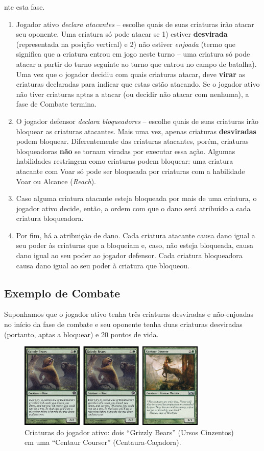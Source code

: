 nte esta fase.

\begin{enumerate}
  \item Jogador ativo \textit{declara atacantes} -- escolhe
quais de suas criaturas irão atacar seu oponente. Uma criatura só pode atacar se 1) estiver \textbf{desvirada} (representada na posição vertical) e 2) não estiver \textit{enjoada} (termo que significa que a criatura entrou em jogo neste turno -- uma criatura só pode atacar a partir do turno seguinte ao turno que entrou no campo de batalha). Uma vez que o jogador decidiu com quais criaturas atacar, deve \textbf{virar} as criaturas declaradas para indicar que estas estão atacando. Se o jogador ativo não tiver criaturas aptas a atacar (ou decidir não atacar com nenhuma), a fase de Combate termina.
    \item O jogador defensor \textit{declara bloqueadores} -- escolhe quais de suas criaturas irão
bloquear as criaturas atacantes. Mais uma vez, apenas criaturas \textbf{desviradas} podem bloquear. Diferentemente das criaturas atacantes, porém, criaturas bloqueadoras \textbf{não} se tornam viradas por executar essa ação. Algumas habilidades restringem como criaturas podem bloquear: uma criatura atacante com Voar só pode ser bloqueada por criaturas com a habilidade Voar ou Alcance (\textit{Reach}).
    \item Caso alguma criatura atacante esteja bloqueada
por mais de uma criatura, o jogador ativo decide, então, a ordem com que o dano será
atribuído a cada criatura bloqueadora.
    \item Por fim, há a atribuição de dano. Cada criatura atacante causa dano igual a seu poder às criaturas que a bloqueiam e, caso, não esteja bloqueada, causa dano igual ao seu poder ao jogador defensor. Cada criatura bloqueadora causa dano igual ao seu poder à criatura que bloqueou.
\end{enumerate}

\subsection{Exemplo de Combate}

Suponhamos que o jogador ativo tenha três criaturas desviradas e não-enjoadas no início da fase de combate e seu oponente tenha duas criaturas desviradas (portanto, aptas a bloquear) e 20 pontos de vida.

\begin{figure}[!h]
  \centering
  \includegraphics[width=0.8\textwidth]{picstcc/att1.png}
  \caption{Criaturas do jogador ativo: dois ``Grizzly Bears'' (Ursos Cinzentos) em uma ``Centaur Courser'' (Centaura-Caçadora).}
  \label{beginattack}
\end{figure}

